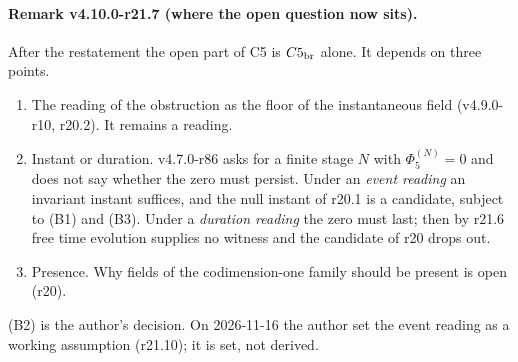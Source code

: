 \paragraph{Remark v4.10.0-r21.7 (where the open question now sits).}
After the restatement the open part of C5 is \(C5_{\rm br}\) alone.  It depends on three points.
\begin{enumerate}[leftmargin=2em]
\item[(B1)] The reading of the obstruction as the floor of the instantaneous field (v4.9.0-r10, r20.2).  It remains a reading.
\item[(B2)] Instant or duration.  v4.7.0-r86 asks for a finite stage \(N\) with \(\Phi_5^{(N)}=0\) and does not say whether the zero must
persist.  Under an \emph{event reading} an invariant instant suffices, and the null instant of r20.1 is a candidate, subject to (B1)
and (B3).  Under a \emph{duration reading} the zero must last; then by r21.6 free time evolution supplies no witness and the
candidate of r20 drops out.
\item[(B3)] Presence.  Why fields of the codimension-one family should be present is open (r20).
\end{enumerate}
(B2) is the author's decision.  On 2026-11-16 the author set the event reading as a working assumption (r21.10); it is set, not derived.


